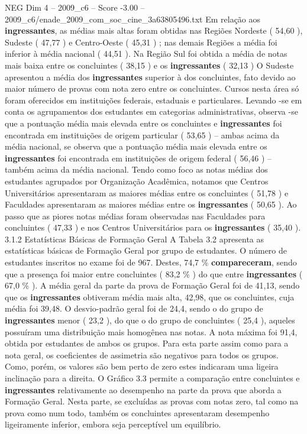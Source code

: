 \begin{textsample}{NEG Dim 4 – 2009\_c6 – Score -3.00 – 2009\_c6/enade\_2009\_com\_soc\_cine\_3a63805496.txt}
Em relação aos \textbf{ingressantes}, as médias mais altas foram obtidas nas Regiões Nordeste ( 54,60 ), Sudeste ( 47,77 ) e Centro-Oeste ( 45,31 ) ; nas demais Regiões a média foi inferior à média nacional ( 44,51 ).
Na Região Sul foi obtida a média de notas mais baixa entre os concluintes ( 38,15 ) e os \textbf{ingressantes} ( 32,13 ) O Sudeste apresentou a média dos \textbf{ingressantes} superior à dos concluintes, fato devido ao maior número de provas com nota zero entre os concluintes.
Cursos nesta área só foram oferecidos em instituições federais, estaduais e particulares.
Levando -se em conta os agrupamentos dos estudantes em categorias administrativas, observa -se que a pontuação média mais elevada entre os concluintes e \textbf{ingressantes} foi encontrada em instituições de origem particular ( 53,65 ) – ambas acima da média nacional, se observa que a pontuação média mais elevada entre os \textbf{ingressantes} foi encontrada em instituições de origem federal ( 56,46 ) – também acima da média nacional.
Tendo como foco as notas médias dos estudantes agrupados por Organização Acadêmica, notamos que Centros Universitários apresentaram as maiores médias entre os concluintes ( 51,78 ) e Faculdades apresentaram as maiores médias entre os \textbf{ingressantes} ( 50,65 ).
Ao passo que as piores notas médias foram observadas nas Faculdades para concluintes ( 47,33 ) e nos Centros Universitários para os \textbf{ingressantes} ( 35,40 ). 3.1.2 Estatísticas Básicas de Formação Geral A Tabela 3.2 apresenta as estatísticas básicas de Formação Geral por grupo de estudantes.
O número de estudantes inscritos no exame foi de 967.
Destes, 74,7 \% \textbf{compareceram}, sendo que a presença foi maior entre concluintes ( 83,2 \% ) do que entre \textbf{ingressantes} ( 67,0 \% ).
A média geral da parte da prova de Formação Geral foi de 41,13, sendo que os \textbf{ingressantes} obtiveram média mais alta, 42,98, que os concluintes, cuja média foi 39,48.
O desvio-padrão geral foi de 24,4, sendo o do grupo de \textbf{ingressantes} menor ( 23,2 ), do que o do grupo de concluintes ( 25,4 ), aqueles possuíram uma distribuição mais homogênea nas notas.
A nota máxima foi 91,4, obtida por estudantes de ambos os grupos.
Para esta parte assim como para a nota geral, os coeficientes de assimetria são negativos para todos os grupos.
Como, porém, os valores são bem perto de zero estes indicaram uma ligeira inclinação para a direita.
O Gráfico 3.3 permite a comparação entre concluintes e \textbf{ingressantes} relativamente ao desempenho na parte da prova que aborda a Formação Geral.
Nesta parte, se excluídas as provas com notas zero, tal como na prova como num todo, também os concluintes apresentaram desempenho ligeiramente inferior, embora seja perceptível um equilíbrio.

\end{textsample}
